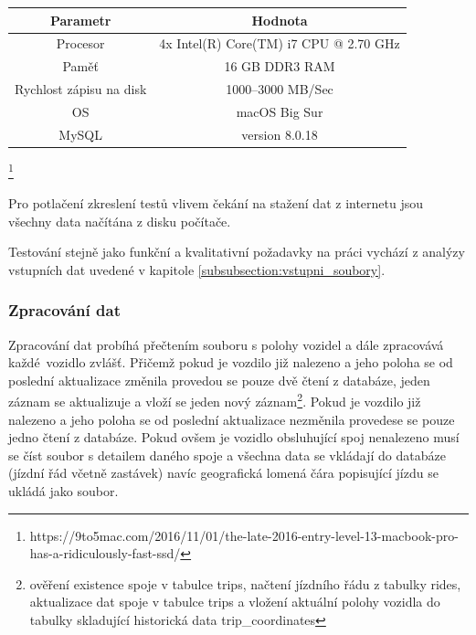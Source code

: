 \begin{center}
	\begin{table}[ht]
\centering
\begin{tabular}{|c|c|}
\hline
 Parametr & Hodnota \\ \hline \hline
 Procesor & 4x Intel(R) Core(TM) i7 CPU @ 2.70 GHz\\ \hline
 Paměť & 16 GB DDR3 RAM  \\  \hline
 Rychlost zápisu na disk & 1000--3000 MB/Sec \\ \hline
 OS & macOS Big Sur\\ \hline
 MySQL & version 8.0.18\\ \hline
\end{tabular}
\label{table:hw}
\end{table}
\end{center}
\footnote{https://9to5mac.com/2016/11/01/the-late-2016-entry-level-13-macbook-pro-has-a-ridiculously-fast-ssd/}
\bigbreak

Pro potlačení zkreslení testů vlivem čekání na stažení dat z internetu jsou všechny data načítána z disku počítače.

\bigbreak

Testování stejně jako funkční a kvalitativní požadavky na práci vychází z analýzy vstupních dat uvedené v kapitole \ref{subsubsection:vstupni_soubory}.

\subsubsection{Zpracování dat}

Zpracování dat probíhá přečtením souboru s polohy vozidel a dále zpracovává každé vozidlo zvlášť. Přičemž pokud je vozdilo již nalezeno a jeho poloha se od poslední aktualizace změnila provedou se pouze dvě čtení z databáze, jeden záznam se aktualizuje a vloží se jeden nový záznam\footnote{ověření existence spoje v tabulce trips, načtení jízdního řádu z tabulky rides, aktualizace dat spoje v tabulce trips a vložení aktuální polohy vozidla do tabulky skladující historická data trip\_coordinates}. Pokud je vozdilo již nalezeno a jeho poloha se od poslední aktualizace nezměnila provedese se pouze jedno čtení z databáze. Pokud ovšem je vozidlo obsluhující spoj nenalezeno musí se číst soubor s detailem daného spoje a všechna data se vkládají do databáze (jízdní řád včetně zastávek) navíc geografická lomená čára popisující jízdu se ukládá jako soubor.

\bigbreak

